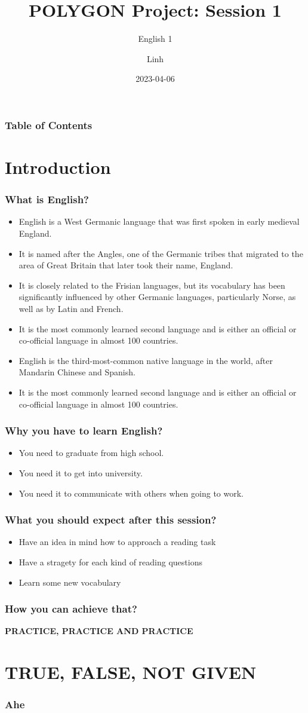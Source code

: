\documentclass{beamer}
\title{POLYGON Project: Session 1}
\subtitle{English 1}
\author{Linh}
\date{2023-04-06}
\begin{document}
\frame{\titlepage}
\begin{frame}
    \frametitle{Table of Contents}
    \tableofcontents
    \end{frame}
\section{Introduction}
\begin{frame}
\frametitle{What is English?}
\begin{itemize}
    \item English is a West Germanic language that was first spoken in early medieval England.
    \item It is named after the Angles, one of the Germanic tribes that migrated to the area of Great Britain that later took their name, England.
    \item It is closely related to the Frisian languages, but its vocabulary has been significantly influenced by other Germanic languages, particularly Norse, as well as by Latin and French.
    \item It is the most commonly learned second language and is either an official or co-official language in almost 100 countries.
    \item English is the third-most-common native language in the world, after Mandarin Chinese and Spanish.
    \item It is the most commonly learned second language and is either an official or co-official language in almost 100 countries.
\end{itemize}
\end{frame}
\begin{frame}
    \frametitle{Why you have to learn English?}
    \begin{itemize}
        \item You need to graduate from high school.
        \item You need it to get into university.
        \item You need it to communicate with others when going to work. 
    \end{itemize}
    \end{frame}
\begin{frame}
    \frametitle{What you should expect after this session?}
        \begin{itemize}
            \item Have an idea in mind how to approach a reading task
            \item Have a stragety for each kind of reading questions
            \item Learn some new vocabulary
        \end{itemize}
    \end{frame}    
\begin{frame}
    \frametitle{How you can achieve that?}
        \textbf{PRACTICE, PRACTICE AND PRACTICE}
    \end{frame}
\section{TRUE, FALSE, NOT GIVEN}
\begin{frame}
    \frametitle{Ahe}
        
    \end{frame}
\end{document}
